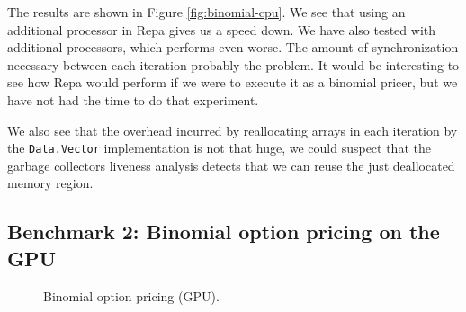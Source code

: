 The results are shown in Figure \ref{fig:binomial-cpu}. We see that
using an additional processor in Repa gives us a speed down. We have
also tested with additional processors, which performs even worse. The
amount of synchronization necessary between each iteration probably
the problem. It would be interesting to see how Repa would perform if
we were to execute it as a binomial pricer, but we have not had the
time to do that experiment.

We also see that the overhead incurred by reallocating arrays in each
iteration by the \texttt{Data.Vector} implementation is not that huge,
we could suspect that the garbage collectors liveness analysis detects
that we can reuse the just deallocated memory region.


\subsection{Benchmark 2: Binomial option pricing on the GPU}
\begin{figure}
	\centering
\begin{adjustbox}{minipage=1.3\textwidth,margin=0pt \smallskipamount,center}
\end{adjustbox}
  \caption{Binomial option pricing (GPU).}
\label{fig:binomial-gpu}
\end{figure}

